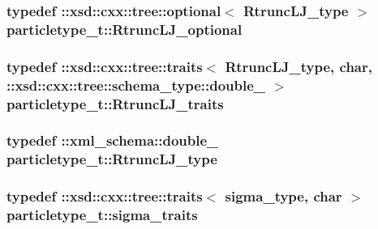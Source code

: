 \subsubsection[{\texorpdfstring{Rtrunc\+L\+J\+\_\+optional}{RtruncLJ_optional}}]{\setlength{\rightskip}{0pt plus 5cm}typedef \+::xsd\+::cxx\+::tree\+::optional$<$ {\bf Rtrunc\+L\+J\+\_\+type} $>$ {\bf particletype\+\_\+t\+::\+Rtrunc\+L\+J\+\_\+optional}}\hypertarget{classparticletype__t_aa09967796541d58a44dfec6bcbb2c431}{}\label{classparticletype__t_aa09967796541d58a44dfec6bcbb2c431}
\subsubsection[{\texorpdfstring{Rtrunc\+L\+J\+\_\+traits}{RtruncLJ_traits}}]{\setlength{\rightskip}{0pt plus 5cm}typedef \+::xsd\+::cxx\+::tree\+::traits$<$ {\bf Rtrunc\+L\+J\+\_\+type}, char, \+::xsd\+::cxx\+::tree\+::schema\+\_\+type\+::double\+\_\+ $>$ {\bf particletype\+\_\+t\+::\+Rtrunc\+L\+J\+\_\+traits}}\hypertarget{classparticletype__t_acbef1d01c89e1d6db8eed5d7b7b8575c}{}\label{classparticletype__t_acbef1d01c89e1d6db8eed5d7b7b8575c}
\subsubsection[{\texorpdfstring{Rtrunc\+L\+J\+\_\+type}{RtruncLJ_type}}]{\setlength{\rightskip}{0pt plus 5cm}typedef \+::{\bf xml\+\_\+schema\+::double\+\_\+} {\bf particletype\+\_\+t\+::\+Rtrunc\+L\+J\+\_\+type}}\hypertarget{classparticletype__t_a3cd2c72b9a4607fb4e7022af7f979d61}{}\label{classparticletype__t_a3cd2c72b9a4607fb4e7022af7f979d61}
\subsubsection[{\texorpdfstring{sigma\+\_\+traits}{sigma_traits}}]{\setlength{\rightskip}{0pt plus 5cm}typedef \+::xsd\+::cxx\+::tree\+::traits$<$ {\bf sigma\+\_\+type}, char $>$ {\bf particletype\+\_\+t\+::sigma\+\_\+traits}}\hypertarget{classparticletype__t_aa2caef2ce2ef568f535961d3ab84df2a}{}\label{classparticletype__t_aa2caef2ce2ef568f535961d3ab84df2a}
